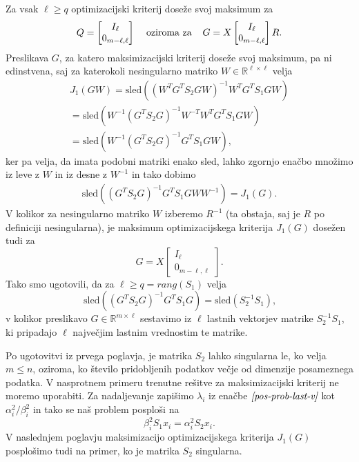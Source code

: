 \documentclass[mat1]{article}
\begin{document}
Za vsak $\ell \geq q$ optimizacijski kriterij doseže svoj maksimum za 
$$ Q = 
\begin{bmatrix}
I_{\ell} \\
0_{m-\ell, \ell}
\end{bmatrix}
\hspace{4mm}
\text{oziroma za}
\hspace{4mm}
G = 
X 
\begin{bmatrix}
I_{\ell} \\
0_{m-\ell, \ell}
\end{bmatrix}
R
\text{.}
$$
Preslikava $G$, za katero maksimizacijski kriterij doseže svoj maksimum, pa ni edinstvena, saj za katerokoli nesingularno matriko $W \in \mathbb{R}^{\ell \times \ell}$ velja
\begin{align*}
J_1(GW) = 
\text{sled}\left( (W^T G^T S_2 G W)^{-1} W^T G^T S_1 GW \right)
\\
=
\text{sled}\left( W^{-1}(G^T S_2 G)^{-1}W^{-T} W^T G^T S_1 GW \right)
\\
=
\text{sled}\left( W^{-1}(G^T S_2 G)^{-1}G^T S_1 GW \right)
\text{,}
\end{align*}
ker pa velja, da imata podobni matriki enako sled, lahko zgornjo enačbo množimo iz leve z $W$ in iz desne z $W^{-1}$ in tako dobimo
\begin{align*}
\text{sled}\left((G^T S_2 G)^{-1} G^T S_1 GW W^{-1} \right)
=
J_1(G)
\text{.}
\end{align*}
V kolikor za nesingularno matriko $W$ izberemo $R^{-1}$ (ta obstaja, saj je $R$ po definiciji nesingularna), je maksimum optimizacijskega kriterija $J_1(G)$ dosežen tudi za 
$$ G = X 
\begin{bmatrix}
I_{\ell} \\
0_{m-\ell, \ell}
\end{bmatrix}
\text{.}
$$
Tako smo ugotovili, da za $\ell \geq q = rang(S_1)$ velja
$$
\text{sled} \left( (G^T S_2 G)^{-1} G^T S_1 G \right)
=
\text{sled} \left( S_2^{-1} S_1 \right)
\text{,}
$$
v kolikor preslikavo $G \in \mathbb{R}^{m \times \ell}$
sestavimo iz $\ell$ lastnih vektorjev matrike $S_2^{-1} S_1$, ki pripadajo $\ell$ največjim lastnim vrednostim te matrike.

Po ugotovitvi iz prvega poglavja, je matrika $S_2$ lahko singularna le, ko velja $m \leq n$, oziroma, ko število pridobljenih podatkov večje od dimenzije posameznega podatka. V nasprotnem primeru trenutne rešitve za maksimizacijski kriterij ne moremo uporabiti. Za nadaljevanje zapišimo $\lambda_i$ iz enačbe $\textit{\eqref{pos-prob-last-v}}$ kot $\alpha_i^2/\beta_i^2$ in tako se naš problem posploši na
\begin{equation} \label{alpha-beta}
\beta_i^2 S_1 x_i = \alpha_i^2 S_2 x_i
\text{.}
\end{equation}
V naslednjem poglavju maksimizacijo optimizacijskega kriterija $J_1(G)$ posplošimo tudi na primer, ko je matrika $S_2$ singularna.
\end{document}
